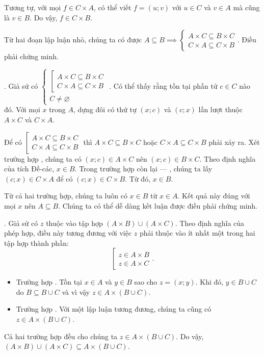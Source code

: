 Tương tự, với mọi $f \in C \times A$, có thể viết $f = (u; v)$ với $u \in C$ và $v \in A$ mà cũng là $v \in B$. Do vậy, $f \in C \times B$.

Từ hai đoạn lập luận nhỏ, chúng ta có được $A \subseteq B \implies \begin{cases}
   A \times C \subseteq B \times C \\
   C \times A \subseteq C \times B
\end{cases}$. Điều phải chứng minh.

. Giả sử có $\begin{cases}
   \left[\begin{array}{l}
      A \times C \subseteq B \times C \\
      C \times A \subseteq C \times B
   \end{array}\right. \\
   C \neq \varnothing
\end{cases}$. Có thể thấy rằng tồn tại phần tử $c \in C$ nào đó. Với mọi $x$ trong $A$, dựng đôi có thứ tự $(x; c)$ và $(c; x)$ lần lượt thuộc $A \times C$ và $C \times A$.

Để có $\left[\begin{array}{l}
   A \times C \subseteq B \times C \\
   C \times A \subseteq C \times B
\end{array}\right.$ thì $A \times C \subseteq B \times C$ hoặc $C \times A \subseteq C \times B$ phải xảy ra. Xét trường hợp , chúng ta có $(x; c) \in A \times C$ nên $(x; c) \in B \times C$. Theo định nghĩa của tích Đề-các, $x \in B$. Trong trường hợp còn lại --- , chúng ta lấy $(c; x) \in C \times A$ để có $(c; x) \in C \times B$. Từ đó, $x \in B$.

Từ cả hai trường hợp, chúng ta luôn có $x \in B$ từ $x \in A$. Kết quả này đúng với mọi $x$ nên $A \subseteq B$. Chúng ta có thể dễ dàng kết luận được điều phải chứng minh.

. Giả sử có $z$ thuộc vào tập hợp $(A \times B) \cup (A \times C)$. Theo định nghĩa của phép hợp, điều này tương đương với việc $z$ phải thuộc vào ít nhất một trong hai tập hợp thành phần:
$$\left[\begin{array}{l}
z \in A \times B \\
z \in A \times C
\end{array}\right..$$
\begin{itemize}
   \item Trường hợp . Tồn tại $x \in A$ và $y \in B$ sao cho $z = (x; y)$. Khi đó, $y \in B \cup C$ do $B \subseteq B \cup C$ và vì vậy $z \in A \times (B \cup C)$.
   \item Trường hợp . Với một lập luận tương đương, chúng ta cũng có $z \in A \times (B \cup C)$.
\end{itemize}
Cả hai trường hợp đều cho chúng ta $z \in A \times (B \cup C)$. Do vậy, $(A \times B) \cup (A \times C) \subseteq A \times (B \cup C)$.

